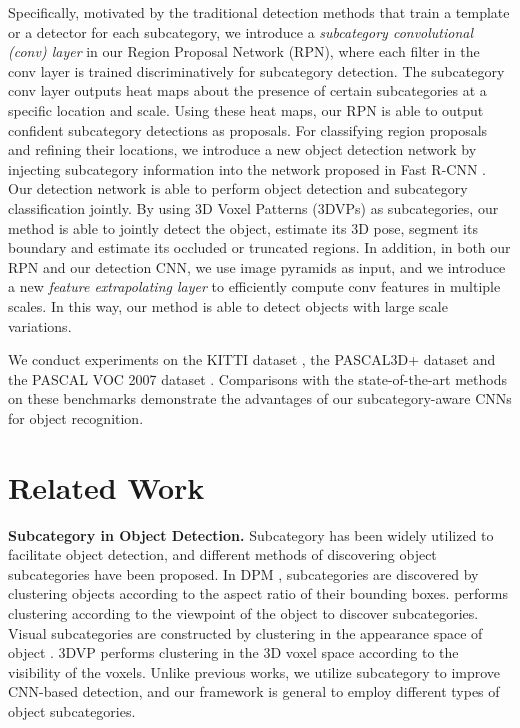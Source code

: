 \documentclass[10pt,twocolumn,letterpaper]{article}
\begin{document}
Specifically, motivated by the traditional detection methods that train a template or a detector for each subcategory, we introduce a \emph{subcategory convolutional (conv) layer} in our Region Proposal Network (RPN), where each filter in the conv layer is trained discriminatively for subcategory detection. The subcategory conv layer outputs heat maps about the presence of certain subcategories at a specific location and scale. Using these heat maps, our RPN is able to output confident subcategory detections as proposals. For classifying region proposals and refining their locations, we introduce a new object detection network by injecting subcategory information into the network proposed in Fast R-CNN \cite{girshick2015fast}. Our detection network is able to perform object detection and subcategory classification jointly. By using 3D Voxel Patterns (3DVPs) \cite{xiang2015data} as subcategories, our method is able to jointly detect the object, estimate its 3D pose, segment its boundary and estimate its occluded or truncated regions. In addition, in both our RPN and our detection CNN, we use image pyramids as input, and we introduce a new \emph{feature extrapolating layer} to efficiently compute conv features in multiple scales. In this way, our method is able to detect objects with large scale variations.

We conduct experiments on the KITTI dataset \cite{geiger2012we}, the PASCAL3D+ dataset \cite{xiang2014beyond} and the PASCAL VOC 2007 dataset \cite{Everingham10}. Comparisons with the state-of-the-art methods on these benchmarks demonstrate the advantages of our subcategory-aware CNNs for object recognition.








\section{Related Work}

\noindent \textbf{Subcategory in Object Detection.} Subcategory has been widely utilized to facilitate object detection, and different methods of discovering object subcategories have been proposed. In DPM \cite{felzenszwalb2010object}, subcategories are discovered by clustering objects according to the aspect ratio of their bounding boxes. \cite{gu2010discriminative} performs clustering according to the viewpoint of the object to discover subcategories. Visual subcategories are constructed by clustering in the appearance space of object \cite{divvala2012important,subcat15,chen2014enriching,divvalalearning}. 3DVP \cite{xiang2015data} performs clustering in the 3D voxel space according to the visibility of the voxels. Unlike previous works, we utilize subcategory to improve CNN-based detection, and our framework is general to employ different types of object subcategories.
\end{document}
